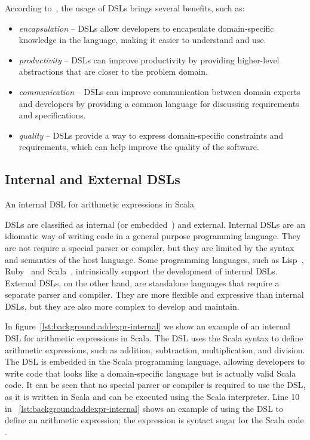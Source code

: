 According to~\cite{Favalli23}, the usage of DSLs brings several benefits, such as:
\begin{itemize}
    \item \textit{encapsulation} -- DSLs allow developers to encapsulate domain-specific knowledge in the language, making it easier to understand and use.
    \item \textit{productivity} -- DSLs can improve productivity by providing higher-level abstractions that are closer to the problem domain.
    \item \textit{communication} -- DSLs can improve communication between domain experts and developers by providing a common language for discussing requirements and specifications.
    \item \textit{quality} -- DSLs provide a way to express domain-specific constraints and requirements, which can help improve the quality of the software.
\end{itemize}

\subsection{Internal and External DSLs}\label{subsec:background:InternalAndExternalDSLs}

\begin{Listing}[t]
    \centering
    \caption{An internal DSL for arithmetic expressions in Scala}
    \label{lst:background:addexpr-internal}
\end{Listing}

DSLs are classified as internal (or embedded~\cite{Fowler10}) and external. Internal DSLs are an idiomatic way of writing code in a general purpose programming language. They are not require a special parser or compiler, but they are limited by the syntax and semantics of the host language.
Some programming languages, such as Lisp~\cite{Fowler05}, Ruby~\cite{Fowler10} and Scala~\cite{Artho15}, intrinsically support the development of internal DSLs.
External DSLs, on the other hand, are standalone languages that require a separate parser and compiler. They are more flexible and expressive than internal DSLs, but they are also more complex to develop and maintain.

In figure~\ref{lst:background:addexpr-internal} we show an example of an internal DSL for arithmetic expressions in Scala. The DSL uses the Scala syntax to define arithmetic expressions, such as addition, subtraction, multiplication, and division. The DSL is embedded in the Scala programming language, allowing developers to write code that looks like a domain-specific language but is actually valid Scala code.
It can be seen that no special parser or compiler is required to use the DSL, as it is written in Scala and can be executed using the Scala interpreter.
Line 10 in ~\ref{lst:background:addexpr-internal} shows an example of using the DSL to define an arithmetic expression; the expression is syntact sugar for the Scala code .

